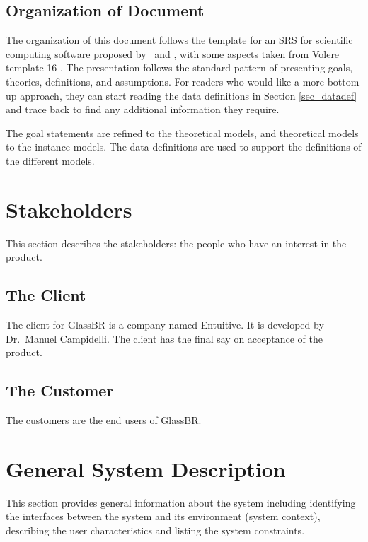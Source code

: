 \documentclass[12pt]{article}
\newcommand{\progname}{GlassBR}
\begin{document}
\subsection{Organization of Document}

The organization of this document follows the template for an SRS for scientific
computing software proposed by~\cite{Koothoor2013} and \cite{SmithAndLai2005},
with some aspects taken from Volere template 16
\cite{RobertsonAndRobertson1999Vol}. The presentation follows the standard
pattern of presenting goals, theories, definitions, and assumptions.  For
readers who would like a more bottom up approach, they can start reading the
data definitions in Section \ref{sec_datadef} and trace back to find any
additional information they require.

The goal statements are refined to the theoretical models, and theoretical
models to the instance models. The data definitions are used to support the
definitions of the different models.

\section{Stakeholders}

This section describes the stakeholders: the people who have an interest in the
product.

\subsection{The Client}

The client for \progname{} is a company named Entuitive. It is developed by
Dr.\ Manuel Campidelli. The client has the final say on acceptance of the product.

\subsection{The Customer}

The customers are the end users of \progname{}.

\section{General System Description}

This section provides general information about the system including identifying
the interfaces between the system and its environment (system context), describing
the user characteristics and listing the system constraints.
\end{document}
